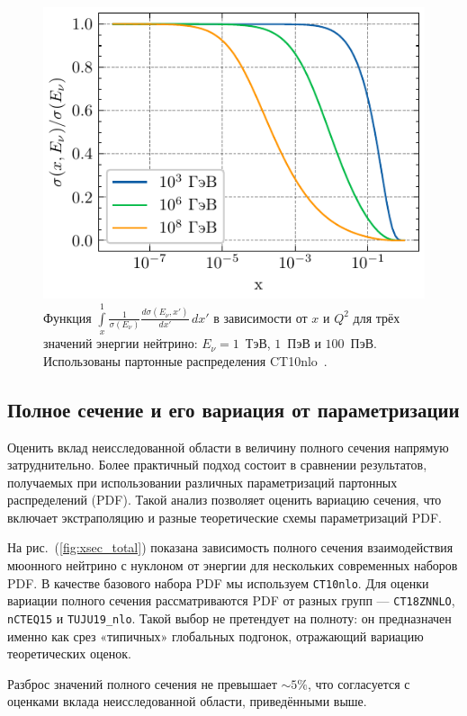 \begin{figure}[!h]
\centering
\includegraphics[width=0.8\linewidth]{images/NuProp/cdfxy_plot_CT10nlo_14.pdf}
\caption{Функция 
$\int\limits_{x}^1 \frac{1}{\sigma(E_\nu)}\frac{d\sigma(E_\nu,x')}{dx'}\,dx'$ 
в зависимости от $x$ и $Q^2$ для трёх значений энергии нейтрино: 
$E_{\nu} = 1$~ТэВ, $1$~ПэВ и $100$~ПэВ. 
Использованы партонные распределения CT10nlo~\cite{Lai_2010}.}
\label{fig:CDF_x}
\end{figure}


\subsection{Полное сечение и его вариация от параметризации}

Оценить вклад неисследованной области в величину полного сечения напрямую затруднительно. 
Более практичный подход состоит в сравнении результатов, получаемых при использовании различных параметризаций партонных распределений (PDF). 
Такой анализ позволяет оценить вариацию сечения, что включает экстраполяцию и разные теоретические схемы параметризаций PDF.

На рис.~(\ref{fig:xsec_total}) показана зависимость полного сечения взаимодействия мюонного нейтрино с нуклоном от энергии для нескольких современных наборов PDF. 
В  качестве базового набора PDF мы используем \texttt{CT10nlo}. 
Для оценки вариации полного сечения рассматриваются PDF от разных групп — \texttt{CT18ZNNLO}, \texttt{nCTEQ15} и \texttt{TUJU19\_nlo}. 
Такой выбор не претендует на полноту: он предназначен именно как срез «типичных» глобальных подгонок, отражающий вариацию теоретических оценок. 

Разброс значений полного сечения не превышает $\sim5\%$, что согласуется с оценками вклада неисследованной области, приведёнными выше.

